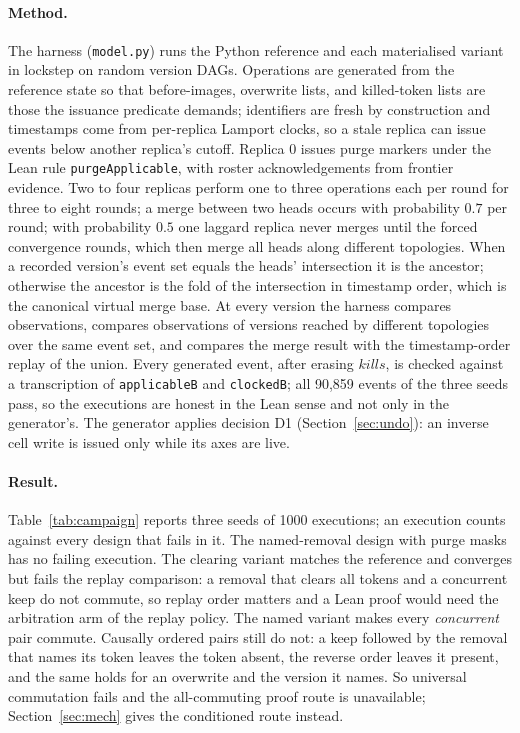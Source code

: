 \documentclass[11pt]{article}
\newcommand{\lean}[1]{\texttt{\def\_{\textunderscore\allowbreak}#1}}
\begin{document}
\paragraph{Method.} The harness (\lean{model.py}) runs the Python
reference and each materialised variant in lockstep on random version DAGs.
Operations are generated from the reference state so that before-images,
overwrite lists, and killed-token lists are those the issuance predicate
demands; identifiers are fresh by construction and timestamps come from
per-replica Lamport clocks, so a stale replica can issue events below another
replica's cutoff. Replica $0$ issues purge markers under the Lean rule
\lean{purgeApplicable}, with roster acknowledgements from frontier evidence.
Two to four replicas perform one to three operations each per round for three
to eight rounds; a merge between two heads occurs with probability $0.7$ per
round; with probability $0.5$ one laggard replica never merges until the
forced convergence rounds, which then merge all heads along different
topologies.
When a recorded version's event set equals the heads' intersection it is the
ancestor; otherwise the ancestor is the fold of the intersection in
timestamp order, which is the canonical virtual merge base. At every version
the harness compares observations, compares observations of versions
reached by different topologies over the same event set, and compares the
merge result with the timestamp-order replay of the union. Every generated
event, after erasing $\mathit{kills}$, is checked against a transcription of
\lean{applicableB} and \lean{clockedB}; all 90{,}859 events of the three
seeds pass, so the executions are honest in the Lean sense and not only in
the generator's. The generator applies decision D1
(Section~\ref{sec:undo}): an inverse cell write is issued only while its
axes are live.

\paragraph{Result.} Table~\ref{tab:campaign} reports three seeds of 1000
executions; an execution counts against every design that fails in it. The
named-removal design with purge masks has no failing execution. The clearing
variant matches the reference and converges but fails the replay comparison:
a removal that clears all tokens and a concurrent keep do not commute, so
replay order matters and a Lean proof would need the arbitration arm of the
replay policy. The named variant makes every \emph{concurrent} pair commute.
Causally ordered pairs still do not: a keep followed by the removal that
names its token leaves the token absent, the reverse order leaves it
present, and the same holds for an overwrite and the version it names. So
universal commutation fails and the all-commuting proof route is
unavailable; Section~\ref{sec:mech} gives the conditioned route instead.
\end{document}
